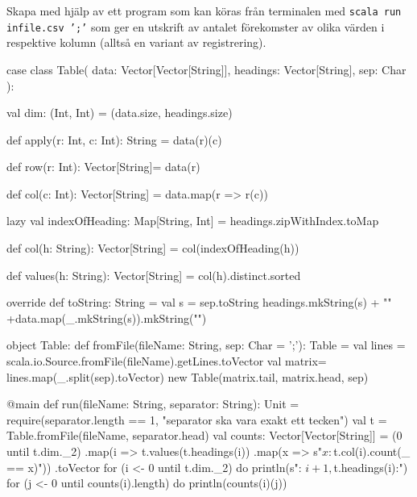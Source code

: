 \Subtask Skapa med hjälp av  ett program som kan köras från terminalen med \texttt{scala run infile.csv ';'} som ger en utskrift av antalet förekomster av olika värden i respektive kolumn (alltså en variant av registrering).



\SOLUTION

\TaskSolved \what

\SubtaskSolved  \begin{CodeSmall}
case class Table(
  data: Vector[Vector[String]],
  headings: Vector[String],
  sep: Char
):

  val dim: (Int, Int) = (data.size, headings.size)

  def apply(r: Int, c: Int): String = data(r)(c)

  def row(r: Int): Vector[String]= data(r)

  def col(c: Int): Vector[String] = data.map(r => r(c))

  lazy val indexOfHeading: Map[String, Int] = headings.zipWithIndex.toMap

  def col(h: String): Vector[String] = col(indexOfHeading(h))

  def values(h: String): Vector[String] = col(h).distinct.sorted

  override def toString: String =
    val s = sep.toString
    headings.mkString(s) + "\n" +data.map(_.mkString(s)).mkString("\n")

object Table:
  def fromFile(fileName: String, sep: Char = ';'): Table = 
    val lines = scala.io.Source.fromFile(fileName).getLines.toVector
    val matrix= lines.map(_.split(sep).toVector)
    new Table(matrix.tail, matrix.head, sep)
\end{CodeSmall}

\SubtaskSolved  \begin{CodeSmall}
@main 
def run(fileName: String, separator: String): Unit = 
  require(separator.length == 1, "separator ska vara exakt ett tecken")
  val t = Table.fromFile(fileName, separator.head)
  val counts: Vector[Vector[String]] =
    (0 until t.dim._2)
      .map(i => t.values(t.headings(i))
      .map(x => s"$x: ${t.col(i).count(_ == x)}"))
      .toVector
  for (i <- 0 until t.dim._2) do
    println(s"\nColumn: ${i + 1}, ${t.headings(i)}:")
    for (j <- 0 until counts(i).length) do
      println(counts(i)(j))
\end{CodeSmall}

\QUESTEND




